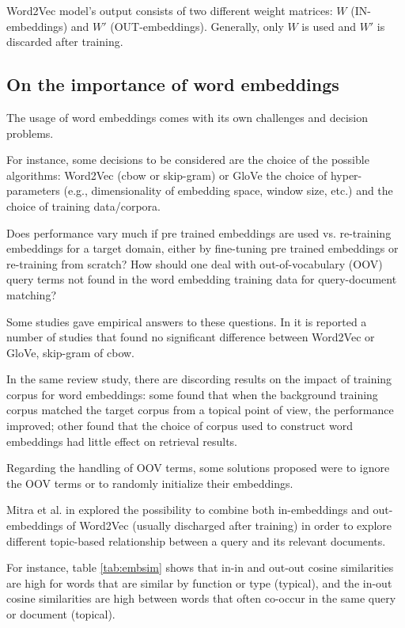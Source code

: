 Word2Vec model's output consists of two different weight matrices: $W$ (IN-embeddings) and $W'$ (OUT-embeddings). Generally, only $W$ is used and $W'$ is discarded after training.

\subsection{On the importance of word embeddings}
The usage of word embeddings comes with its own challenges and decision problems.

For instance, some decisions to be considered are the choice of the possible algorithms: Word2Vec (cbow or skip-gram) \cite{w2v} or GloVe the choice of hyper-parameters (e.g., dimensionality of embedding space, window size, etc.) and the choice of training data/corpora.

Does performance vary much if pre trained embeddings are used vs. re-training embeddings for a target domain, either by fine-tuning pre trained embeddings or re-training from scratch? How should one deal with out-of-vocabulary (OOV) query terms not found in the word embedding training data for query-document matching?

Some studies gave empirical answers to these questions. In \cite{neurev} it is reported a number of studies that found no significant difference between Word2Vec or GloVe, skip-gram of cbow.

In the same review study, there are discording results on the impact of training corpus for word embeddings: some found that when the background training corpus matched the target corpus from a topical point of view, the performance improved; other found that the choice of corpus used to construct word embeddings had little effect on retrieval results.

Regarding the handling of OOV terms, some solutions proposed were to ignore the OOV terms or to randomly initialize their embeddings.

Mitra et al. in \cite{Mitra2016ADE} explored the possibility to combine both in-embeddings and out-embeddings of Word2Vec (usually discharged after training) in order to explore different topic-based relationship between a query and its relevant documents.

For instance, table \ref{tab:embsim} shows that in-in and out-out cosine similarities are high for words that are similar by function or type (typical), and the in-out cosine similarities are high between words that often co-occur in the same query or document (topical).


